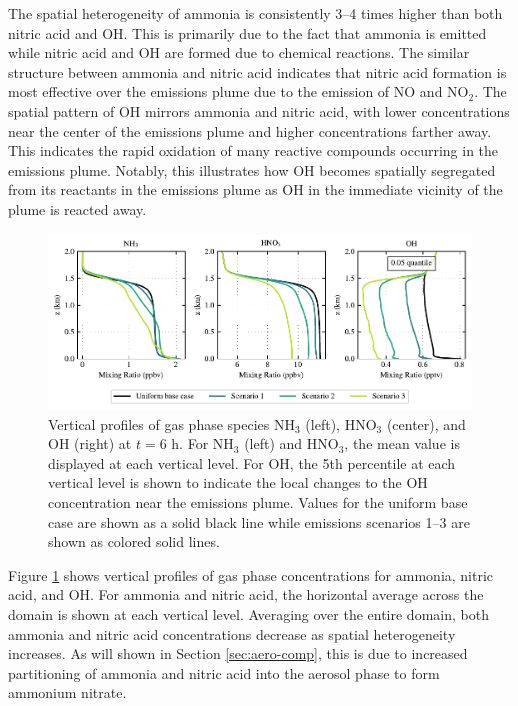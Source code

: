 \documentclass[journal abbreviation, manuscript]{copernicus}
\begin{document}
The spatial heterogeneity of ammonia is consistently 3--4 times higher than both nitric acid and OH. This is primarily due to the fact that ammonia is emitted while nitric acid and OH are formed due to chemical reactions. The similar structure between ammonia and nitric acid indicates that nitric acid formation is most effective over the emissions plume due to the emission of NO and NO$_2$. The spatial pattern of OH mirrors ammonia and nitric acid, with lower concentrations near the center of the emissions plume and higher concentrations farther away. This indicates the rapid oxidation of many reactive compounds occurring in the emissions plume. Notably, this illustrates how OH becomes spatially segregated from its reactants in the emissions plume as OH in the immediate vicinity of the plume is reacted away. 

\begin{figure}[!h]
	\centering
	\includegraphics[]{figures/aerosol-gas-vertical-profiles-time36.pdf}
	\caption{Vertical profiles of gas phase species NH$_3$ (left), HNO$_3$ (center), and OH (right) at $t=6$ h. For NH$_3$ (left) and HNO$_3$, the mean value is displayed at each vertical level. For OH, the 5th percentile at each vertical level is shown to indicate the local changes to the OH concentration near the emissions plume. Values for the uniform base case are shown as a solid black line while emissions scenarios 1--3 are shown as colored solid lines.}
	\label{fig:gas-profiles}
\end{figure} 

Figure \ref{fig:gas-profiles} shows vertical profiles of gas phase concentrations for ammonia, nitric acid, and OH. For ammonia and nitric acid, the horizontal average across the domain is shown at each vertical level.  Averaging over the entire domain, both ammonia and nitric acid concentrations decrease as spatial heterogeneity increases. As will shown in Section \ref{sec:aero-comp}, this is due to increased partitioning of ammonia and nitric acid into the aerosol phase to form ammonium nitrate. 
\end{document}
